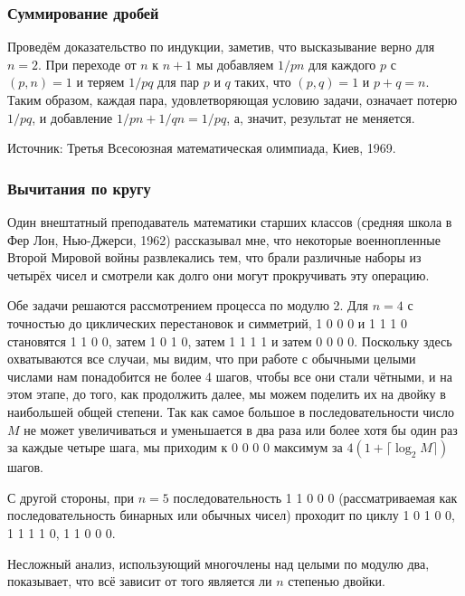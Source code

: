 \subsubsection*{Суммирование дробей}%

Проведём доказательство по индукции, заметив, что высказывание верно для $n=2$.
При переходе от $n$ к $n+1$ мы добавляем $1/pn$ для каждого $p$ с $(p,n)=1$ и теряем $1/pq$ для пар $p$ и $q$ таких, что $(p,q)=1$ и $p+q=n$.
Таким образом, каждая пара, удовлетворяющая условию задачи, означает потерю $1/pq$, и добавление $1/pn+1/qn=1/pq$, а, значит, результат не меняется.\heart

Источник: Третья Всесоюзная математическая олимпиада, Киев, 1969.

\subsubsection*{Вычитания по кругу}%

Один внештатный преподаватель математики старших классов (средняя школа в Фер Лон, Нью-Джерси, 1962)
рассказывал мне,
что некоторые военнопленные Второй Мировой войны развлекались тем, что брали различные наборы из четырёх чисел и смотрели как долго они могут прокручивать эту операцию.

\medskip

Обе задачи решаются рассмотрением процесса по модулю 2.
Для $n=4$ с точностью до циклических перестановок и симметрий, 1 0 0 0 и
1 1 1 0 становятся 1 1 0 0, затем 1 0 1 0, затем 1 1 1 1 и затем 0 0 0 0.
Поскольку здесь охватываются все случаи, мы видим, что при работе с обычными целыми числами нам понадобится не более 4 шагов, чтобы все они стали чётными, и на этом этапе, до того, как продолжить далее, мы можем поделить их на двойку в наибольшей общей степени.
Так как самое большое в последовательности число $M$ не может увеличиваться и уменьшается в два раза или более хотя бы один раз за каждые четыре шага, 
мы приходим к 0 0 0 0 максимум за $4(1+\lceil\log_2 M\rceil)$ шагов.

С другой стороны, при $n=5$ последовательность 1 1 0 0 0 (рассматриваемая как последовательность бинарных или обычных чисел)
проходит по циклу 
1 0 1 0 0, 
1 1 1 1 0, 
1 1 0 0 0.\heart 

Несложный анализ, использующий многочлены над целыми по модулю два, показывает, что всё зависит от того является ли $n$ степенью двойки.

